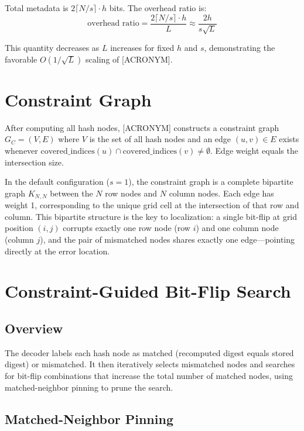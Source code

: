 Total metadata is $2\lceil N/s \rceil \cdot h$ bits. The overhead ratio is:
\begin{equation}
    \text{overhead ratio} = \frac{2\lceil N/s \rceil \cdot h}{L} \approx \frac{2h}{s\sqrt{L}}
    \label{eq:overhead}
\end{equation}

This quantity decreases as $L$ increases for fixed $h$ and $s$, demonstrating the favorable $O(1/\sqrt{L})$ scaling of [ACRONYM].

\section{Constraint Graph}

After computing all hash nodes, [ACRONYM] constructs a constraint graph $G_C = (V, E)$ where $V$ is the set of all hash nodes and an edge $(u, v) \in E$ exists whenever $\text{covered\_indices}(u) \cap \text{covered\_indices}(v) \neq \emptyset$. Edge weight equals the intersection size.

In the default configuration ($s=1$), the constraint graph is a complete bipartite graph $K_{N,N}$ between the $N$ row nodes and $N$ column nodes. Each edge has weight 1, corresponding to the unique grid cell at the intersection of that row and column. This bipartite structure is the key to localization: a single bit-flip at grid position $(i,j)$ corrupts exactly one row node (row $i$) and one column node (column $j$), and the pair of mismatched nodes shares exactly one edge---pointing directly at the error location.

\section{Constraint-Guided Bit-Flip Search}

\subsection{Overview}

The decoder labels each hash node as matched (recomputed digest equals stored digest) or mismatched. It then iteratively selects mismatched nodes and searches for bit-flip combinations that increase the total number of matched nodes, using matched-neighbor pinning to prune the search.

\subsection{Matched-Neighbor Pinning}

